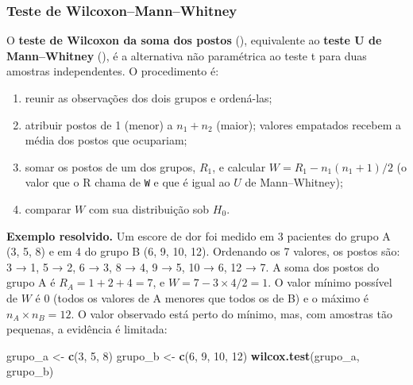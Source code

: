 \documentclass[
]{book}
\newenvironment{Shaded}{\begin{snugshade}}{\end{snugshade}}
\newcommand{\DecValTok}[1]{\textcolor[rgb]{0.00,0.00,0.81}{#1}}
\newcommand{\FunctionTok}[1]{\textcolor[rgb]{0.13,0.29,0.53}{\textbf{#1}}}
\newcommand{\NormalTok}[1]{#1}
\newcommand{\OtherTok}[1]{\textcolor[rgb]{0.56,0.35,0.01}{#1}}
\providecommand{\tightlist}{%
  \setlength{\itemsep}{0pt}\setlength{\parskip}{0pt}}
\begin{document}
\subsubsection{Teste de Wilcoxon--Mann--Whitney}\label{teste-de-wilcoxonmannwhitney}

O \textbf{teste de Wilcoxon da soma dos postos} (), equivalente ao \textbf{teste U de Mann--Whitney} (), é a alternativa não paramétrica ao teste t para duas amostras independentes. O procedimento é:

\begin{enumerate}
\def\labelenumi{\arabic{enumi}.}
\tightlist
\item
  reunir as observações dos dois grupos e ordená-las;
\item
  atribuir postos de 1 (menor) a \(n_1 + n_2\) (maior); valores empatados recebem a média dos postos que ocupariam;
\item
  somar os postos de um dos grupos, \(R_1\), e calcular \(W = R_1 - n_1(n_1 + 1)/2\) (o valor que o R chama de \texttt{W} e que é igual ao \(U\) de Mann--Whitney);
\item
  comparar \(W\) com sua distribuição sob \(H_0\).
\end{enumerate}

\textbf{Exemplo resolvido.} Um escore de dor foi medido em 3 pacientes do grupo A (3, 5, 8) e em 4 do grupo B (6, 9, 10, 12). Ordenando os 7 valores, os postos são: 3 → 1, 5 → 2, 6 → 3, 8 → 4, 9 → 5, 10 → 6, 12 → 7. A soma dos postos do grupo A é \(R_A = 1 + 2 + 4 = 7\), e \(W = 7 - 3 \times 4/2 = 1\). O valor mínimo possível de \(W\) é 0 (todos os valores de A menores que todos os de B) e o máximo é \(n_A \times n_B = 12\). O valor observado está perto do mínimo, mas, com amostras tão pequenas, a evidência é limitada:

\begin{Shaded}
\begin{Highlighting}[]
\NormalTok{grupo\_a }\OtherTok{\textless{}{-}} \FunctionTok{c}\NormalTok{(}\DecValTok{3}\NormalTok{, }\DecValTok{5}\NormalTok{, }\DecValTok{8}\NormalTok{)}
\NormalTok{grupo\_b }\OtherTok{\textless{}{-}} \FunctionTok{c}\NormalTok{(}\DecValTok{6}\NormalTok{, }\DecValTok{9}\NormalTok{, }\DecValTok{10}\NormalTok{, }\DecValTok{12}\NormalTok{)}
\FunctionTok{wilcox.test}\NormalTok{(grupo\_a, grupo\_b)}
\end{Highlighting}
\end{Shaded}
\end{document}
